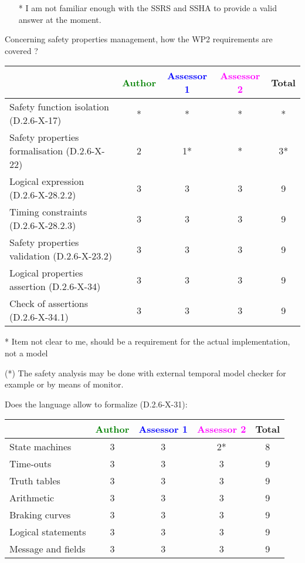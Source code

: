 \begin{assessor2}
  \begin{itemize}
  \item[*] I am not familiar enough with the SSRS and SSHA to provide a
    valid answer at the moment.
  \end{itemize}  
\end{assessor2}


Concerning safety properties management, how the WP2 requirements are covered ?

\begin{tabular}{|l | c | c | c | c|}
\hline
& \textcolor{green}{Author} & \textcolor{blue}{Assessor 1} & \textcolor{magenta}{Assessor 2} & Total \\
\hline
Safety function isolation (D.2.6-X-17) &* & * & * & * \\
\hline
Safety properties formalisation (D.2.6-X-22) &2 &1* & * & 3* \\
\hline
Logical expression (D.2.6-X-28.2.2) &3 &3 &3 & 9  \\
\hline
Timing constraints (D.2.6-X-28.2.3) &3 &3 &3 & 9 \\
\hline
Safety properties validation (D.2.6-X-23.2) &3 &3 &3 & 9 \\
\hline
Logical properties assertion (D.2.6-X-34) &3 &3 &3 & 9 \\
\hline
Check of assertions (D.2.6-X-34.1) &3 &3 &3 & 9 \\
\hline
\end{tabular}


\begin{author_comment}
* Item not clear to me, should be a requirement for the actual implementation, not a model
\end{author_comment}

\begin{assessor1}
(*) The safety analysis may be done with external temporal model
checker for example or by means of monitor. 
\end{assessor1}
Does the language allow to formalize (D.2.6-X-31):

\begin{tabular}{|l | c | c | c | c|}
\hline
& \textcolor{green}{Author} & \textcolor{blue}{Assessor 1} & \textcolor{magenta}{Assessor 2} & Total \\
\hline
State machines &3 &3 & 2* & 8 \\
\hline
Time-outs &3 &3 &3 & 9 \\
\hline
Truth tables &3 &3 &3 & 9 \\
\hline
Arithmetic &3 &3 &3 & 9 \\
\hline
Braking curves &3 &3 &3 & 9 \\
\hline
Logical statements &3 &3 &3 & 9 \\
\hline
Message and fields &3 &3 &3 & 9 \\
\hline
\end{tabular}

